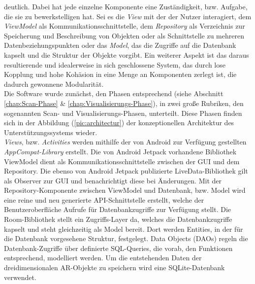 deutlich. Dabei hat jede einzelne Komponente eine Zuständigkeit, bzw. Aufgabe, die sie zu bewerkstelligen hat. Sei es die \textit{View} 
mit der der Nutzer interagiert, dem \textit{ViewModel} als Kommunikationsschnittstelle, dem %
\textit{Repository} als Verzeichnis zur Speicherung und Beschreibung von Objekten oder als Schnittstelle zu mehreren Datenbeziehungspunkten 
oder das \textit{Model}, das die Zugriffe auf die Datenbank kapselt und die Struktur der Objekte vorgibt. %
Ein weiterer Aspekt ist das daraus resultierende und idealerweise in sich geschlossene System, das durch lose Kopplung und hohe Kohäsion in 
eine Menge an Komponenten zerlegt ist, die dadurch gewonnene Modularität. 
\\ 
\linebreak
Die Software wurde zunächst, den Phasen entsprechend (siehe Abschnitt \ref{chap:Scan-Phase} \& \ref{chap:Visualisierungs-Phase}), in zwei 
große Rubriken, den sogenannten Scan- und Visualisierungs-Phasen, unterteilt. Diese Phasen finden sich in der Abbildung (\ref{pic:architectur}) der 
konzeptionellen Architektur des Unterstützungssystems wieder. 
\\
\textit{Views}, bzw. \textit{Activities} werden mithilfe der von Android zur Verfügung gestellten \textit{AppCompat-Library} erstellt. Die 
von Android Jetpack vorhandene Bibliothek ViewModel dient als Kommunikationsschnittstelle zwischen der \acs{GUI} und dem Repository. 
Die ebenso von Android Jetpack publizierte LiveData-Bibliothek gilt als Observer zur \acs{GUI} und benachrichtigt diese bei Änderungen. Mit 
der Repository-Komponente zwischen ViewModel und Datenbank, bzw. Model wird eine reine und neu generierte \acs{API}-Schnittstelle erstellt, 
welche der Benutzeroberfläche Aufrufe für Datenbankzugriffe zur Verfügung stellt. Die Room-Bibliothek stellt ein Zugriffs-Layer da, welches 
die Datenbankzugriffe kapselt und steht gleichzeitig als Model bereit. Dort werden Entities, in der für die Datenbank vorgesehene 
Struktur, festgelegt. Data Objects (DAOs) regeln die Datenbank-Zugriffe über definierte SQL-Queries, die vorab, den Funktionen entsprechend, 
modelliert werden. Um die entstehenden Daten der dreidimensionalen \acs{AR}-Objekte zu speichern wird eine SQLite-Datenbank verwendet.
